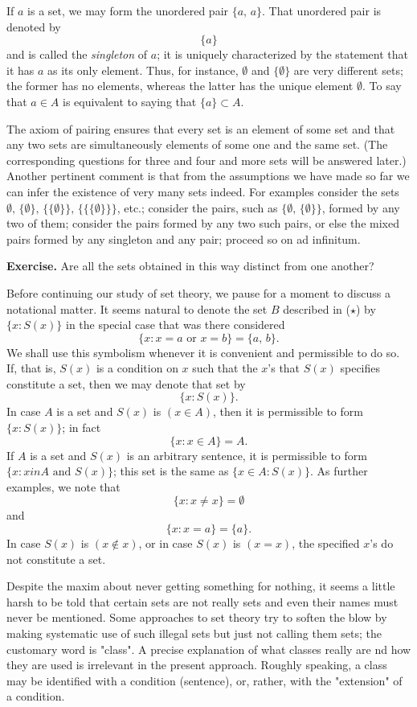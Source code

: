 If $a$ is a set, we may form the unordered pair $\{a, \, a\}$. That unordered pair is denoted by
\[
	\{a\}
\]
and is called the \textit{singleton} of $a$; it is uniquely characterized by the statement that it has $a$ as its only element. Thus, for instance, $\emptyset$ and $\{\emptyset\}$ are very different sets; the former has no elements, whereas the latter has the unique element $\emptyset$. To say that $a \in A$ is equivalent to saying that $\{a\} \subset A$.

The axiom of pairing ensures that every set is an element of some set and that any two sets are simultaneously elements of some one and the same set. (The corresponding questions for three and four and more sets will be answered later.) Another pertinent comment is that from the assumptions we have made so far we can infer the existence of very many sets indeed. For examples consider the sets $\emptyset, \, \{\emptyset
\}, \, \{\{\emptyset\}\}, \, \{\{\{\emptyset\}\}\}$, etc.; consider the pairs, such as $\{\emptyset, \, \{\emptyset\}\}$, formed by any two of them; consider the pairs formed by any two such pairs, or else the mixed pairs formed by any singleton and any pair; proceed so on ad infinitum.

\begin{center}
	\textbf{Exercise.} Are all the sets obtained in this way distinct from one another?
\end{center}

Before continuing our study of set theory, we pause for a moment to discuss a notational matter. It seems natural to denote the set $B$ described in ($\star$) by $\{x : S(x)\}$ in the special case that was there considered
\[
	\{x : x = a \text{ or } x = b\} = \{ a, \, b\}.
\]
We shall use this symbolism whenever it is convenient and permissible to do so. If, that is, $S(x)$ is a condition on $x$ such that the $x$'s that $S(x)$ specifies constitute a set, then we may denote that set by
\[
	\{x : S(x)\}.
\]
In case $A$ is a set and $S(x)$ is $(x \in A)$, then it is permissible to form $\{x : S(x)\}$; in fact
\[
	\{x : x \in A\} = A.
\]
If $A$ is a set and $S(x)$ is an arbitrary sentence, it is permissible to form $\{x : x in A \text{ and } S(x)\}$; this set is the same as $\{x \in A : S(x)\}$. As further examples, we note that
\[
	\{x : x \neq x\} = \emptyset
\]
and
\[
	\{x : x = a\} = \{a\}.
\]
In case $S(x)$ is $(x \not \in x)$, or in case $S(x)$ is $(x = x)$, the specified $x$'s do not constitute a set.

Despite the maxim about never getting something for nothing, it seems a little harsh to be told that certain sets are not really sets and even their names must never be mentioned. Some approaches to set theory try to soften the blow by making systematic use of such illegal sets but just not calling them sets; the customary word is "class". A precise explanation of what classes really are nd how they are used is irrelevant in the present approach. Roughly speaking, a class may be identified with a condition (sentence), or, rather, with the "extension" of a condition.